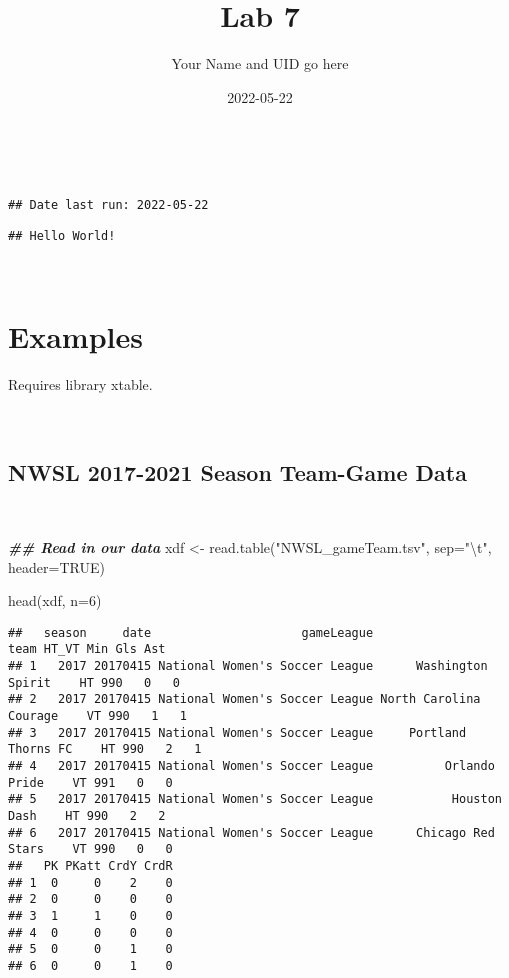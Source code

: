 \documentclass[
]{article}
\title{Lab 7}
\author{Your Name and UID go here}
\date{2022-05-22}
\newenvironment{Shaded}{\begin{snugshade}}{\end{snugshade}}
\newcommand{\AttributeTok}[1]{\textcolor[rgb]{0.77,0.63,0.00}{#1}}
\newcommand{\ConstantTok}[1]{\textcolor[rgb]{0.00,0.00,0.00}{#1}}
\newcommand{\DecValTok}[1]{\textcolor[rgb]{0.00,0.00,0.81}{#1}}
\newcommand{\DocumentationTok}[1]{\textcolor[rgb]{0.56,0.35,0.01}{\textbf{\textit{#1}}}}
\newcommand{\FunctionTok}[1]{\textcolor[rgb]{0.00,0.00,0.00}{#1}}
\newcommand{\NormalTok}[1]{#1}
\newcommand{\OtherTok}[1]{\textcolor[rgb]{0.56,0.35,0.01}{#1}}
\newcommand{\SpecialCharTok}[1]{\textcolor[rgb]{0.00,0.00,0.00}{#1}}
\newcommand{\StringTok}[1]{\textcolor[rgb]{0.31,0.60,0.02}{#1}}
\begin{document}
\maketitle

{
\setcounter{tocdepth}{3}
\tableofcontents
}
\fontsize{10}{11}

~~

\begin{verbatim}
## Date last run: 2022-05-22
\end{verbatim}

\begin{verbatim}
## Hello World!
\end{verbatim}

~~

\hypertarget{examples}{%
\section{Examples}\label{examples}}

Requires library xtable.

~~

\hypertarget{nwsl-2017-2021-season-team-game-data}{%
\subsection{NWSL 2017-2021 Season Team-Game
Data}\label{nwsl-2017-2021-season-team-game-data}}

~~

\begin{Shaded}
\begin{Highlighting}[]
\DocumentationTok{\#\# Read in our data}
\NormalTok{xdf }\OtherTok{\textless{}{-}} \FunctionTok{read.table}\NormalTok{(}\StringTok{"NWSL\_gameTeam.tsv"}\NormalTok{, }\AttributeTok{sep=}\StringTok{"}\SpecialCharTok{\textbackslash{}t}\StringTok{"}\NormalTok{, }\AttributeTok{header=}\ConstantTok{TRUE}\NormalTok{)}

\FunctionTok{head}\NormalTok{(xdf, }\AttributeTok{n=}\DecValTok{6}\NormalTok{)}
\end{Highlighting}
\end{Shaded}

\begin{verbatim}
##   season     date                     gameLeague                   team HT_VT Min Gls Ast
## 1   2017 20170415 National Women's Soccer League      Washington Spirit    HT 990   0   0
## 2   2017 20170415 National Women's Soccer League North Carolina Courage    VT 990   1   1
## 3   2017 20170415 National Women's Soccer League     Portland Thorns FC    HT 990   2   1
## 4   2017 20170415 National Women's Soccer League          Orlando Pride    VT 991   0   0
## 5   2017 20170415 National Women's Soccer League           Houston Dash    HT 990   2   2
## 6   2017 20170415 National Women's Soccer League      Chicago Red Stars    VT 990   0   0
##   PK PKatt CrdY CrdR
## 1  0     0    2    0
## 2  0     0    0    0
## 3  1     1    0    0
## 4  0     0    0    0
## 5  0     0    1    0
## 6  0     0    1    0
\end{verbatim}
\end{document}
